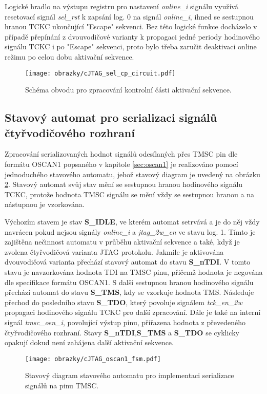 Logické hradlo na výstupu registru pro nastavení \textit{online\_i} signálu využívá resetovací signál \textit{sel\_rst} k zapsání log. 0 na signál \textit{online\_i}, ihned se sestupnou hranou \acs{TCKC} ukončující "Escape" sekvenci. Bez této logické funkce docházelo v případě přepínání z dvouvodičové varianty k propagaci jedné periody hodinového signálu \acs{TCKC} i po "Escape" sekvenci, proto bylo třeba zaručit deaktivaci online režimu po celou dobu aktivační sekvence.

\begin{figure}[H]
  \begin{center}
    \texttt{[image: obrazky/cJTAG\_sel\_cp\_circuit.pdf]}
  \end{center}
  \caption{Schéma obvodu pro zpracování kontrolní části aktivační sekvence.}
	\label{fig:cJTAG_sel_cp_circuit}
\end{figure}

\subsection{Stavový automat pro serializaci signálů čtyřvodičového rozhraní}	\label{subsec:oscan1_fsm}
Zpracování serializovaných hodnot signálů odesílaných přes \acs{TMSC} pin dle formátu OSCAN1 popsaného v kapitole \ref{sec:oscan1} je realizováno pomocí jednoduchého stavového automatu, jehož stavový diagram je uvedený na obrázku \ref{fig:cJTAG_oscan1_fsm}. Stavový automat svůj stav mění se sestupnou hranou hodinového signálu \acs{TCKC}, protože hodnota \acs{TMSC} signálu se mění vždy se sestupnou hranou a na nástupnou je vzorkována.

Výchozím stavem je stav \textbf{S\_IDLE}, ve kterém automat setrvává a je do něj vždy navrácen pokud nejsou signály \textit{online\_i} a \textit{jtag\_2w\_en} ve stavu log. 1. Tímto je zajištěna nečinnost automatu v průběhu aktivační sekvence a také, když je zvolena čtyřvodičová varianta \acs{JTAG} protokolu. Jakmile je aktivována dvouvodičová varianta přechází stavový automat do stavu \textbf{S\_nTDI}. V tomto stavu je navzorkována hodnota TDI na \acs{TMSC} pinu, přičemž hodnota je negována dle specifikace formátu OSCAN1. S další sestupnou hranou hodinového signálu přechází automat do stavu \textbf{S\_TMS}, kdy se vzorkuje hodnota TMS. Následuje přechod do posledního stavu \textbf{S\_TDO}, který povoluje signálem \textit{tck\_en\_2w} propagaci hodinového signálu \acs{TCKC} pro další zpracování. Dále je také na interní signál \textit{tmsc\_oen\_i}, povolující výstup pinu, přiřazena hodnota z převedeného čtyřvodičového rozhraní. Stavy \textbf{S\_nTDI},\textbf{S\_TMS} a \textbf{S\_TDO} se cyklicky opakují dokud není zahájena další aktivační sekvence.

\begin{figure}[!h]
  \begin{center}
    \texttt{[image: obrazky/cJTAG\_oscan1\_fsm.pdf]}
  \end{center}
  \caption{Stavový diagram stavového automatu pro implementaci serializace signálů na pinu \acs{TMSC}.}
	\label{fig:cJTAG_oscan1_fsm}
\end{figure}